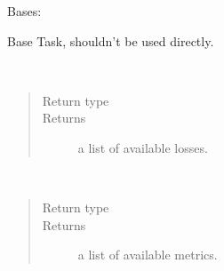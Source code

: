 \documentclass[letterpaper,10pt,english]{sphinxmanual}
\begin{document}
\begin{fulllineitems}
\label{\detokenize{matchzoo.engine:matchzoo.engine.base_task.BaseTask}}
Bases: 

Base Task, shouldn’t be used directly.

\begin{fulllineitems}
\label{\detokenize{matchzoo.engine:matchzoo.engine.base_task.BaseTask.list_available_losses}}~\begin{quote}\begin{description}
\item[{Return type}] \leavevmode
{}

\item[{Returns}] \leavevmode
a list of available losses.

\end{description}\end{quote}

\end{fulllineitems}


\begin{fulllineitems}
\label{\detokenize{matchzoo.engine:matchzoo.engine.base_task.BaseTask.list_available_metrics}}~\begin{quote}\begin{description}
\item[{Return type}] \leavevmode
{}

\item[{Returns}] \leavevmode
a list of available metrics.

\end{description}\end{quote}

\end{fulllineitems}



\end{fulllineitems}
\end{document}
